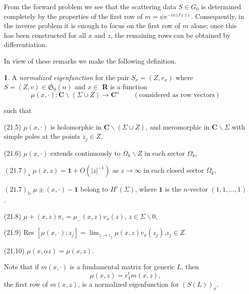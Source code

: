 \documentclass{surv-l}
\theoremstyle{plain}
\theoremstyle{definition}
\newtheorem{definition}[theorem]{\sc{Definition}}
\numberwithin{equation}{chapter}
\begin{document}
From the forward problem we see that the scattering data $S\in G_{0}$ is determined completely by the properties of the first row of $m=\psi e^{-ixzJ(z)}$. Consequently, in the inverse problem it is enough to focus on the first row of $m$ alone; once this has been constructed for all $x$ and $z$, the remaining rows can be obtained by differentiation.

In view of these remarks we make the following definition.
\setcounter{theorem}{3}
\begin{definition}\label{defi21.4}
A \emph{normalized eigenfunction} for the pair $S_{x}= (Z, v_{x})$ where $S=(Z, v)\in \mathfrak{S}_{0}(n)$ and $x\in$ \textbf{R} is a function
\begin{equation*}
\mu(x,\cdot):\mathbf{C}\backslash (\Sigma\cup Z)\rightarrow \mathbf{C}^{n} \qquad  (\text{considered as row vectors})
\end{equation*}
\end{definition}
such that

(21.5) $\mu(x, \cdot)$ is holomorphic in $\mathbf{C}\backslash (\Sigma\cup Z)$, and meromorphic in $ \mathbf{C}\backslash \Sigma$ with simple poles at the points $z_{j}\in Z$,

(21.6) $\mu(x, \cdot)$ extends continuously to $\overline{\Omega}_{k}\backslash Z$ in each sector $\Omega_{k}$,

$\mathrm{(21.7)_{a}}$ $\mu(x,z)=\mathbf{1}+O(|z|^{-1})$ as $ z\rightarrow\infty$ in each closed sector $\overline{\Omega}_{k}$,

$\mathrm{(21.7)_{b}}$ $\mu\pm(x, \cdot)-\mathbf{1}$ belong to $H'(\Sigma)$, where $\mathbf{1}$ is the $n$-vector $(1,1,\ldots, 1)$.

(21.8) $\mu+(x, z)\pi_{z}=\mu_{-}(x,z)v_{x}(z)$, \qquad $z\in\Sigma\backslash 0$,

(21.9)  Res $[\mu(x, \cdot); z_{j}]=\lim_{z\rightarrow z_{j}}\mu(x,z)v_{x}(z_{j})$,\qquad $z_{j}\in Z$.

(21.10) $\mu(x,\alpha z)=\mu(x,z)$.

Note that if $m(x, \cdot)$ is a fundamental matrix for generic $L$, then
\begin{equation*}
\mu(x, z)=e_{1}^{t}m(x,z),
\end{equation*}
the first row of $m(x, z)$, is a normalized eigenfunction for $(S(L))_{x}$.
\end{document}
